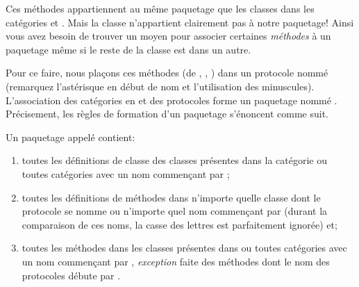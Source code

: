 \documentclass[a4paper,10pt,twoside]{book}
\begin{document}
\noindent
Ces m\'ethodes appartiennent au m\^eme paquetage que les classes
dans les cat\'egories  et .
Mais la classe  n'appartient clairement pas \`a notre paquetage!
Ainsi vous avez besoin de trouver un moyen pour associer certaines
\emph{m\'ethodes} \`a un paquetage m\^eme si le reste de la classe est dans
un autre. 

Pour ce faire, nous pla\c{c}ons ces m\'ethodes (de , ,  \etc) dans un protocole nomm\'e  (remarquez l'ast\'erisque en d\'ebut de nom et l'utilisation des minuscules). L'association des
cat\'egories en  et des protocoles  
forme un paquetage nomm\'e .
Pr\'ecisement, les r\`egles de formation d'un paquetage s'\'enoncent comme suit.

Un paquetage appel\'e  contient:

\begin{enumerate}		\label{sec:packageRules}
	\item{} toutes les d\'efinitions de classe des classes pr\'esentes dans
la cat\'egorie  ou toutes cat\'egories avec un nom commen\c{c}ant par
;
	\item{} \label{env:extensions} toutes les d\'efinitions de m\'ethodes
dans n'importe quelle classe dont le protocole se nomme  ou n'importe
quel nom commen\c{c}ant par  (durant la comparaison
de ces noms, la casse des lettres est parfaitement ignor\'ee) et;
	\item{} toutes les m\'ethodes dans les classes pr\'esentes dans
 ou toutes cat\'egories avec un nom commen\c{c}ant par , \emph{exception} faite des m\'ethodes dont le nom des protocoles d\'ebute par 
\prot{*}.
\end{enumerate}
\end{document}
